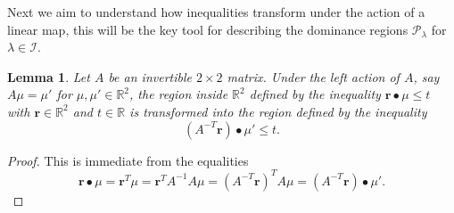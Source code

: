 \documentclass{amsart}
\newtheorem{lemma}[theorem]{Lemma}
\numberwithin{theorem}{section}
\newcommand{\bfr}{\boldsymbol{r}}
\newcommand{\cI}{\mathcal{I}}
\newcommand{\cP}{\mathcal{P}}
\newcommand{\RR}{\mathbb{R}}
\begin{document}
  Next we aim to understand how inequalities transform under the action of a linear map, this will be the key tool for describing the dominance regions $\cP_\lambda$ for $\lambda\in\cI$.

  \begin{lemma}
    \label{le:transformed inequalities}
    Let $A$ be an invertible $2\times 2$ matrix.
    Under the left action of $A$, say $A\mu=\mu'$ for $\mu,\mu'\in\RR^2$, the region inside $\RR^2$ defined by the inequality $\bfr\bullet\mu \le t$ with $\bfr\in\RR^2$ and $t\in\RR$ is transformed into the region defined by the inequality \[(A^{-T}\bfr)\bullet\mu'\le t.\]
  \end{lemma}
  \begin{proof}
    This is immediate from the equalities
    \[\bfr\bullet\mu=\bfr^T\mu=\bfr^TA^{-1}A\mu=(A^{-T}\bfr)^TA\mu=(A^{-T}\bfr)\bullet\mu'.\]
  \end{proof}
  
\end{document}
